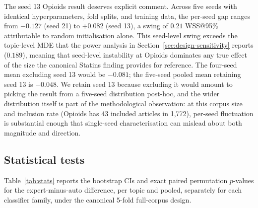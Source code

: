 \documentclass{article}
\begin{document}
The seed 13 Opioids result deserves explicit comment. Across five seeds with identical hyperparameters, fold splits, and training data, the per-seed gap ranges from $-0.127$ (seed 21) to $+0.082$ (seed 13), a swing of $0.21$ WSS@95\% attributable to random initialisation alone. This seed-level swing exceeds the topic-level MDE that the power analysis in Section~\ref{sec:design-sensitivity} reports ($0.189$), meaning that seed-level instability at Opioids dominates any true effect of the size the canonical Statins finding provides for reference. The four-seed mean excluding seed 13 would be $-0.081$; the five-seed pooled mean retaining seed 13 is $-0.048$. We retain seed 13 because excluding it would amount to picking the result from a five-seed distribution post-hoc, and the wider distribution itself is part of the methodological observation: at this corpus size and inclusion rate (Opioids has 43 included articles in 1,772), per-seed fluctuation is substantial enough that single-seed characterisation can mislead about both magnitude and direction.

\subsection{Statistical tests}

Table~\ref{tab:stats} reports the bootstrap CIs and exact paired permutation $p$-values for the expert-minus-auto difference, per topic and pooled, separately for each classifier family, under the canonical 5-fold full-corpus design.
\end{document}
